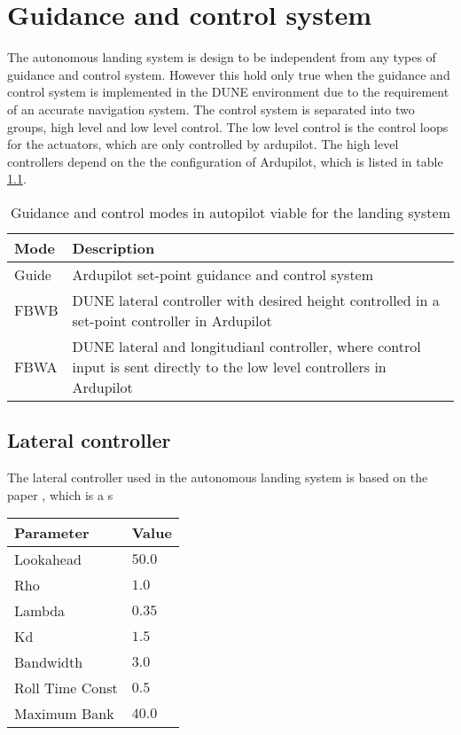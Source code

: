 \chapter{Guidance and control system}
The autonomous landing system is design to be independent from any types of guidance and control system. However this hold only true when the guidance and control system is implemented in the DUNE environment due to the requirement of an accurate navigation system. The control system is separated into two groups, high level and low level control. The low level control is the control loops for the actuators, which are only controlled by ardupilot. The high level controllers depend on the the configuration of Ardupilot, which is listed in table \ref{tb:ArduPilotMode}.
\begin{table}
\centering
\begin{tabular}{| p{3cm} | p{5cm}|}
\hline
\textbf{Mode}	&	\textbf{Description} \\ \hline
Guide			& Ardupilot set-point guidance and control system 												\\ \hline
FBWB			& DUNE lateral controller with desired height controlled in a set-point controller in Ardupilot \\ \hline
FBWA			& DUNE lateral and longitudianl controller, where control input is sent directly to the low level controllers in Ardupilot 																						\\ \hline
\end{tabular}
\caption{Guidance and control modes in autopilot viable for the landing system}
\label{tb:ArduPilotMode}
\end{table}

\section{Lateral controller}
The lateral controller used in the autonomous landing system is based on the paper \citep{fortuna2015cascaded}, which is a s

\begin{table}
\centering
\begin{tabular}{| l | l |}
\hline
\textbf{Parameter}	&	\textbf{Value} \\ \hline
Lookahead           &                    $50.0$ \\ \hline
Rho                 &                    $1.0$ \\ \hline
Lambda				&                    $0.35$ \\ \hline
Kd					&                    $1.5$ \\ \hline
Bandwidth			&                    $3.0$ \\ \hline
Roll Time Const		&                    $0.5$ \\ \hline
Maximum Bank		&                    $40.0$ \\ \hline

\end{tabular}
\end{table}
